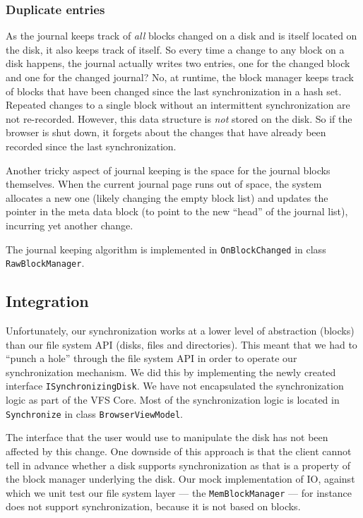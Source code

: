 \documentclass[a4paper,12pt]{article}
\begin{document}
\subsubsection{Duplicate entries}
As the journal keeps track of \emph{all} blocks changed on a disk and is itself located on the disk, it also keeps track of itself.
So every time a change to any block on a disk happens, the journal actually writes two entries, one for the changed block and one for the changed journal?
No, at runtime, the block manager keeps track of blocks that have been changed since the last synchronization in a hash set.
Repeated changes to a single block without an intermittent synchronization are not re-recorded.
However, this data structure is \emph{not} stored on the disk. 
So if the browser is shut down, it forgets about the changes that have already been recorded since the last synchronization.

Another tricky aspect of journal keeping is the space for the journal blocks themselves. 
When the current journal page runs out of space, the system allocates a new one (likely changing the empty block list) and updates the pointer in the meta data block (to point to the new ``head'' of the journal list), incurring yet another change.

The journal keeping algorithm is implemented in \lstinline!OnBlockChanged! in class \lstinline!RawBlockManager!.

\subsection{Integration}
Unfortunately, our synchronization works at a lower level of abstraction (blocks) than our file system API (disks, files and directories).
This meant that we had to ``punch a hole'' through the file system API in order to operate our synchronization mechanism.
We did this by implementing the newly created interface \lstinline!ISynchronizingDisk!. 
We have not encapsulated the synchronization logic as part of the VFS Core. 
Most of the synchronization logic is located in \lstinline!Synchronize! in class \lstinline!BrowserViewModel!.

The interface that the user would use to manipulate the disk has not been affected by this change.
One downside of this approach is that the client cannot tell in advance whether a disk supports synchronization as that is a property of the block manager underlying the disk.
Our mock implementation of IO, against which we unit test our file system layer --- the \lstinline!MemBlockManager! --- for instance does not support synchronization, because it is not based on blocks.
\end{document}
